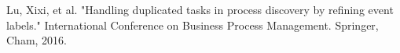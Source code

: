 \documentclass[notitlepage]{article}
\begin{document}


\begin{thebibliography}{5}
Lu, Xixi, et al. "Handling duplicated tasks in process discovery by refining event labels." International Conference on Business Process Management. Springer, Cham, 2016.









\end{thebibliography}
\end{document}
